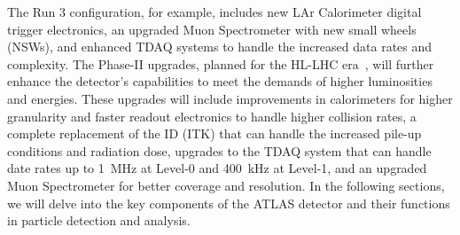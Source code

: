     The Run 3 configuration, for example, includes new LAr Calorimeter digital trigger electronics, 
    an upgraded Muon Spectrometer with new small wheels (NSWs), and enhanced TDAQ systems to handle the increased data rates and complexity. 
    The Phase-II upgrades, planned for the HL-LHC era~\cite{ATLAS-TDR-PhaseII,ATLAS-TDR-25,ATLAS-TDR-26,ATLAS-TDR-27,ATLAS-TDR-28,ATLAS-TDR-29,ATLAS-TDR-30,ATLAS-TDR-31}, 
    will further enhance the detector's capabilities to meet the demands of higher luminosities and energies. 
    These upgrades will include 
    improvements in calorimeters for higher granularity and faster readout electronics to handle higher collision rates,
    a complete replacement of the ID (ITK) that can handle 
    the increased pile-up conditions and radiation dose,
    upgrades to the TDAQ system that can handle date rates up to 1~MHz at Level-0 and 400~kHz at Level-1,
    and an upgraded Muon Spectrometer for better coverage and resolution. 
    In the following sections, we will delve into the key components of the ATLAS detector
    and their functions in particle detection and analysis. 

